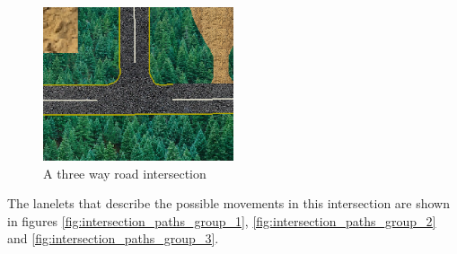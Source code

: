 \begin{figure}[h!]
    \centering
    \includegraphics[width=0.5\textwidth]{intersection_original}
    \caption{A three way road intersection \label{fig:intersection_original} }
\end{figure}

The lanelets that describe the possible movements in this intersection are shown in figures \ref{fig:intersection_paths_group_1}, \ref{fig:intersection_paths_group_2} and \ref{fig:intersection_paths_group_3}.

